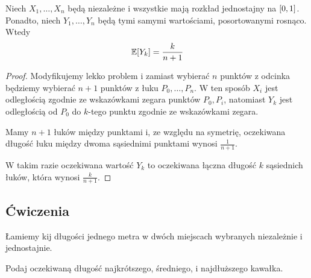 \begin{theorem}
	Niech \( X_1, \dots, X_n \) będą niezależne i wszystkie mają rozkład jednostajny na \( \left[0, 1\right] \).
	Ponadto, niech \( Y_1, \dots, Y_n \) będą tymi samymi wartościami, posortowanymi rosnąco. Wtedy
	\[
		\expected{Y_k} = \frac{k}{n + 1}
	\]
\end{theorem}
\begin{proof}
	Modyfikujemy lekko problem i zamiast wybierać \( n \) punktów z odcinka będziemy wybierać \( n + 1 \) punktów z łuku \(P_0, \dots, P_n\).
	W ten sposób \( X_i \) jest odległością zgodnie ze wskazówkami zegara punktów \( P_0, P_i \),
	natomiast \( Y_k \) jest odległością od \( P_0 \) do \(k\)-tego punktu zgodnie ze wskazówkami zegara.

	Mamy \( n + 1 \) łuków między punktami i, ze względu na symetrię, oczekiwana długość łuku między dwoma sąsiednimi punktami wynosi \( \frac{1}{n + 1} \).

	W takim razie oczekiwana wartość \( Y_k \) to oczekiwana łączna długość \( k \) sąsiednich łuków, która wynosi \( \frac{k}{n + 1} \).
\end{proof}

\newpage
\subsection{Ćwiczenia}
\begin{exercise}
	\label{breaking-sticks-in-three-parts}
	Łamiemy kij długości jednego metra w dwóch miejscach wybranych niezależnie i jednostajnie.

	Podaj oczekiwaną długość najkrótszego, średniego, i najdłuższego kawałka.
\end{exercise}

